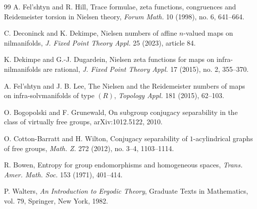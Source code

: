\documentclass[11pt]{article}
\begin{document}
\begin{thebibliography}{99}
A. Fel'shtyn and R. Hill,
Trace formulae, zeta functions, congruences and Reidemeister torsion in
Nielsen theory,
\emph{Forum Math.} 10 (1998), no. 6, 641--664.

C. Deconinck and K. Dekimpe,
Nielsen numbers of affine $n$-valued maps on nilmanifolds,
\emph{J. Fixed Point Theory Appl.} 25 (2023), article 84.

K. Dekimpe and G.-J. Dugardein,
Nielsen zeta functions for maps on infra-nilmanifolds are rational,
\emph{J. Fixed Point Theory Appl.} 17 (2015), no. 2, 355--370.

A. Fel'shtyn and J. B. Lee,
The Nielsen and the Reidemeister numbers of maps on infra-solvmanifolds of
type $(R)$,
\emph{Topology Appl.} 181 (2015), 62--103.

O. Bogopolski and F. Grunewald,
On subgroup conjugacy separability in the class of virtually free groups,
arXiv:1012.5122, 2010.

O. Cotton-Barratt and H. Wilton,
Conjugacy separability of $1$-acylindrical graphs of free groups,
\emph{Math. Z.} 272 (2012), no. 3--4, 1103--1114.

R. Bowen,
Entropy for group endomorphisms and homogeneous spaces,
\emph{Trans. Amer. Math. Soc.} 153 (1971), 401--414.

P. Walters,
\emph{An Introduction to Ergodic Theory},
Graduate Texts in Mathematics, vol. 79,
Springer, New York, 1982.

\end{thebibliography}
\end{document}
